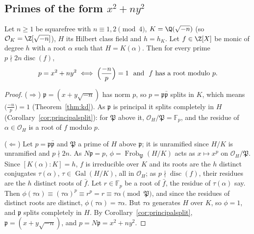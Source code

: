 \subsection*{Primes of the form \texorpdfstring{$x^2+ny^2$}{x²+ny²}}

\begin{theorem}\label{thm:xnyy}
Let $n\ge1$ be squarefree with $n\equiv1,2\pmod4$, $K=\Q(\sqrt{-n})$ (so $\mathcal O_K=\Z[\sqrt{-n}]$), $H$ its Hilbert class field and $h=h_K$. Let
$f\in\Z[X]$ be monic of degree $h$ with a root $\alpha$ such that $H=K(\alpha)$. Then for every prime $p\nmid2n\operatorname{disc}(f)$,
\[
p=x^2+ny^2\iff\Bigl(\frac{-n}p\Bigr)=1\ \text{ and }\ f\text{ has a root modulo }p.
\]
\end{theorem}
\begin{proof}
($\Rightarrow$) $\mathfrak p=(x+y\sqrt{-n})$ has norm $p$, so $p=\mathfrak p\bar{\mathfrak p}$ splits in $K$, which means $\bigl(\frac{-n}p\bigr)=1$
(Theorem~\ref{thm:kd}). As $\mathfrak p$ is principal it splits completely in $H$ (Corollary~\ref{cor:principalsplit}): for $\mathfrak P$ above it,
$\mathcal O_H/\mathfrak P=\mathbb F_p$, and the residue of $\alpha\in\mathcal O_H$ is a root of $f$ modulo $p$.

($\Leftarrow$) Let $p=\mathfrak p\bar{\mathfrak p}$ and $\mathfrak P$ a prime of $H$ above $\mathfrak p$; it is unramified since $H/K$ is unramified and $p\nmid2n$. As
$N\mathfrak p=p$, $\phi=\operatorname{Frob}_{\mathfrak P}(H/K)$ acts as $x\mapsto x^p$ on $\mathcal O_H/\mathfrak P$. Since $[K(\alpha):K]=h$, $f$ is irreducible over $K$ and
its roots are the $h$ distinct conjugates $\tau(\alpha)$, $\tau\in\operatorname{Gal}(H/K)$, all in $\mathcal O_H$; as $p\nmid\operatorname{disc}(f)$, their residues are
the $h$ distinct roots of $\bar f$. Let $r\in\mathbb F_p$ be a root of $\bar f$, the residue of $\tau(\alpha)$ say. Then $\phi(\tau\alpha)\equiv(\tau\alpha)^p
\equiv r^p=r\equiv\tau\alpha\pmod{\mathfrak P}$, and since the residues of distinct roots are distinct, $\phi(\tau\alpha)=\tau\alpha$. But $\tau\alpha$
generates $H$ over $K$, so $\phi=1$, and $\mathfrak p$ splits completely in $H$. By Corollary~\ref{cor:principalsplit}, $\mathfrak p=(x+y\sqrt{-n})$, and
$p=N\mathfrak p=x^2+ny^2$.
\end{proof}

